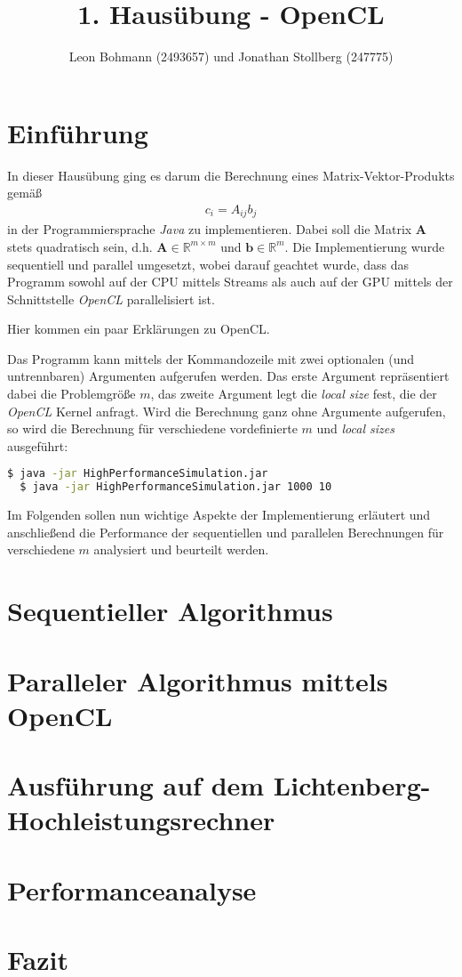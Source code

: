 \documentclass[
	ngerman,
	ruledheaders=section,
	class=report,
	thesis={type=Dokumentation},
	ignore-missing-data=true,
	accentcolor=9c,
	custommargins=false,
	marginpar=false,
	parskip=half-,
	fontsize=11pt,
]{tudapub}
\begin{document}

\title{1. Hausübung - OpenCL}
\author[]{Leon Bohmann (2493657) und Jonathan Stollberg (247775)}
\submissiondate{\today}

\maketitle
\tableofcontents

\chapter{Einführung}
In dieser Hausübung ging es darum die Berechnung eines Matrix-Vektor-Produkts gemäß
\begin{align*}
	c_{i} = A_{ij}b_{j}
\end{align*}
in der Programmiersprache \textit{Java} zu implementieren. Dabei soll die Matrix $\mathbf{A}$ stets quadratisch sein, d.h. $\mathbf{A} \in \mathbb{R}^{m\times m}$ und $\mathbf{b} \in \mathbb{R}^{m}$. Die Implementierung wurde sequentiell und parallel umgesetzt, wobei darauf geachtet wurde, dass das Programm sowohl auf der CPU mittels Streams als auch auf der GPU mittels der Schnittstelle \textit{OpenCL} parallelisiert ist.

Hier kommen ein paar Erklärungen zu OpenCL.

Das Programm kann mittels der Kommandozeile mit zwei optionalen (und untrennbaren) Argumenten aufgerufen werden. Das erste Argument repräsentiert dabei die Problemgröße $m$, das zweite Argument legt die \textit{local size} fest, die der \textit{OpenCL} Kernel anfragt. Wird die Berechnung ganz ohne Argumente aufgerufen, so wird die Berechnung für verschiedene vordefinierte $m$ und \textit{local sizes} ausgeführt:
\begin{lstlisting}[language=bash]
  $ java -jar HighPerformanceSimulation.jar
  $ java -jar HighPerformanceSimulation.jar 1000 10
\end{lstlisting}

Im Folgenden sollen nun wichtige Aspekte der Implementierung erläutert und anschließend die Performance der sequentiellen und parallelen Berechnungen für verschiedene $m$ analysiert und beurteilt werden.

\chapter{Sequentieller Algorithmus}

\chapter{Paralleler Algorithmus mittels OpenCL}

\chapter{Ausführung auf dem Lichtenberg-Hochleistungsrechner}

\chapter{Performanceanalyse}

\chapter{Fazit}
\end{document}
